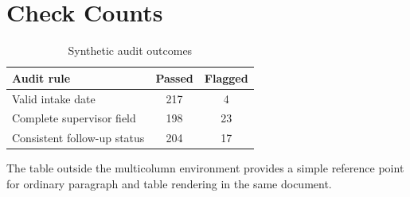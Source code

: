 \documentclass[11pt]{article}
\begin{document}
\section{Check Counts}
\label{sec:check-counts}

\begin{table}[htbp]
\centering
\caption{Synthetic audit outcomes}
\label{tab:audit}
\begin{tabular}{lcc}
\toprule
Audit rule & Passed & Flagged \\
\midrule
Valid intake date & 217 & 4 \\
Complete supervisor field & 198 & 23 \\
Consistent follow-up status & 204 & 17 \\
\bottomrule
\end{tabular}
\end{table}

The table outside the multicolumn environment provides a simple reference point
for ordinary paragraph and table rendering in the same document.
\end{document}
